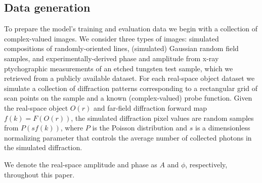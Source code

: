 \documentclass[sn-mathphys]{sn-jnl}%
\theoremstyle{thmstyleone}%
\theoremstyle{thmstyletwo}%
\theoremstyle{thmstylethree}%
\begin{document}
\subsection{Data generation}
To prepare the model's training and evaluation data we begin with a collection of complex-valued images. We consider three types of images: simulated compositions of randomly-oriented lines, (simulated) Gaussian random field samples, and experimentally-derived phase and amplitude from x-ray ptychographic measurements of an etched tungsten test sample, which we retrieved from a publicly available dataset. For each real-space object dataset we simulate a collection of diffraction patterns corresponding to a rectangular grid of scan points on the sample and a known (complex-valued) probe function. Given the real-space object $O(r)$ and far-field diffraction forward map $f(k) = F(O(r))$, the simulated diffraction pixel values are random samples from $P(s f(k))$, where $P$ is the Poisson distribution and $s$ is a dimensionless normalizing parameter that controls the average number of collected photons in the simulated diffraction. 

We denote the real-space amplitude and phase as $A$ and $\phi$, respectively, throughout this paper. 


%
\end{document}
